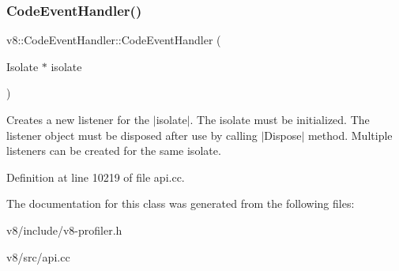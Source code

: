 \subsubsection{\texorpdfstring{Code\+Event\+Handler()}{CodeEventHandler()}}
{\footnotesize\ttfamily v8\+::\+Code\+Event\+Handler\+::\+Code\+Event\+Handler (\begin{DoxyParamCaption}\item[{Isolate $\ast$}]{isolate }\end{DoxyParamCaption})\hspace{0.3cm}{\ttfamily [explicit]}}

Creates a new listener for the $\vert$isolate$\vert$. The isolate must be initialized. The listener object must be disposed after use by calling $\vert$\+Dispose$\vert$ method. Multiple listeners can be created for the same isolate. 

Definition at line 10219 of file api.\+cc.



The documentation for this class was generated from the following files\+:\begin{DoxyCompactItemize}
\item 
v8/include/v8-\/profiler.\+h\item 
v8/src/api.\+cc\end{DoxyCompactItemize}

